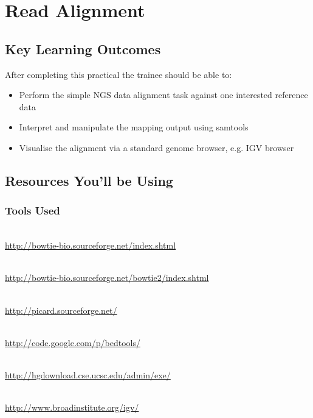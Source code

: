 \renewcommand{\moduleTitle}{Read Alignment}
\renewcommand{\moduleAuthors}{%
  Myrto Kostadima \mailto{kostadim@ebi.ac.uk}
} \renewcommand{\moduleContributions}{%
  Xi Li \mailto{sean.li@csiro.au}%
}

\chapter{\moduleTitle}
\newpage

\section{Key Learning Outcomes}

After completing this practical the trainee should be able to:
\begin{itemize}
  \item Perform the simple NGS data alignment task against one interested reference data \\
  \item Interpret and manipulate the mapping output using samtools \\
  \item Visualise the alignment via a standard genome browser, e.g. IGV browser \\
\end{itemize}
\section{Resources You'll be Using}
 
\subsection{Tools Used}
\begin{description}[style=multiline,labelindent=0cm,align=left,leftmargin=0.5cm]
  \item[Bowtie]\hfill\\
  	\url{http://bowtie-bio.sourceforge.net/index.shtml}
  \item[Bowtie 2]\hfill\\
  	\url{http://bowtie-bio.sourceforge.net/bowtie2/index.shtml}
  \item[Samtools]\hfill\\
  	\url{http://picard.sourceforge.net/}
  \item[BEDTools]\hfill\\
  	\url{http://code.google.com/p/bedtools/}
  \item[UCSC tools]\hfill\\
  	\url{http://hgdownload.cse.ucsc.edu/admin/exe/}  
  \item[IGV genome browser]\hfill\\
  	\url{http://www.broadinstitute.org/igv/}
\end{description}

